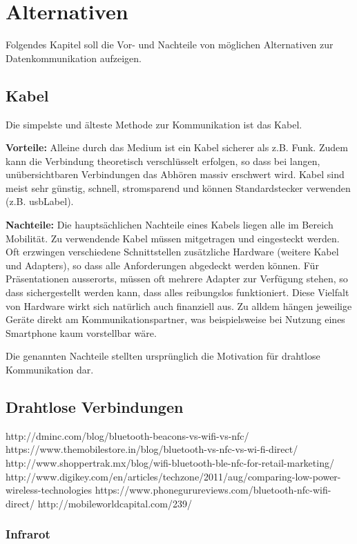 \chapter{Alternativen}
\label{ch:alt}
Folgendes Kapitel soll die Vor- und Nachteile von möglichen Alternativen zur Datenkommunikation aufzeigen.

\section{Kabel}
Die simpelste und älteste Methode zur Kommunikation ist das Kabel.

\textbf{Vorteile:} Alleine durch das Medium ist ein Kabel sicherer als z.B. Funk. Zudem kann die Verbindung theoretisch verschlüsselt erfolgen, so dass bei langen, unübersichtbaren Verbindungen das Abhören massiv erschwert wird. Kabel sind meist sehr günstig, schnell, stromsparend und können Standardstecker verwenden (z.B. \gls{usbLabel}).

\textbf{Nachteile:} Die hauptsächlichen Nachteile eines Kabels liegen alle im Bereich Mobilität.
Zu verwendende Kabel müssen mitgetragen und eingesteckt werden.
Oft erzwingen verschiedene Schnittstellen zusätzliche Hardware (weitere Kabel und Adapters), so dass alle Anforderungen abgedeckt werden können.
Für Präsentationen ausserorts, müssen oft mehrere Adapter zur Verfügung stehen, so dass sichergestellt werden kann, dass alles reibungslos funktioniert.
Diese Vielfalt von Hardware wirkt sich natürlich auch finanziell aus. Zu alldem hängen jeweilige Geräte direkt am Kommunikationspartner, was beispielsweise bei Nutzung eines Smartphone kaum vorstellbar wäre.

Die genannten Nachteile stellten ursprünglich die Motivation für drahtlose Kommunikation dar.


\section{Drahtlose Verbindungen}
http://dminc.com/blog/bluetooth-beacons-vs-wifi-vs-nfc/
https://www.themobilestore.in/blog/bluetooth-vs-nfc-vs-wi-fi-direct/
http://www.shoppertrak.mx/blog/wifi-bluetooth-ble-nfc-for-retail-marketing/
http://www.digikey.com/en/articles/techzone/2011/aug/comparing-low-power-wireless-technologies
https://www.phonegurureviews.com/bluetooth-nfc-wifi-direct/
http://mobileworldcapital.com/239/



\subsection{Infrarot}



